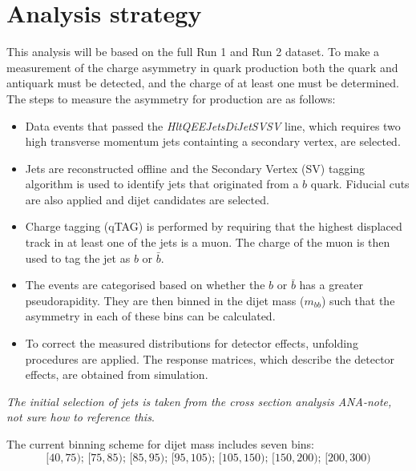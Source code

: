 \section{Analysis strategy} \label{sec:strategy}
This analysis will be based on the full Run 1 and Run 2 dataset. To make a measurement of the charge asymmetry in quark production both the quark and antiquark must be detected, and the charge of at least one must be determined. The steps to measure the asymmetry for \bbbar production are as follows:
\begin{itemize}
    \item Data events that passed the \textit{HltQEEJetsDiJetSVSV} \hlttwo line, which requires two high transverse momentum jets containting a secondary vertex, are selected.
    \item Jets are reconstructed offline and the Secondary Vertex (SV) tagging algorithm is used to identify jets that originated from a $b$ quark. Fiducial cuts are also applied and dijet candidates are selected.
    \item Charge tagging (qTAG) is performed by requiring that the highest \pt displaced track in at least one of the jets is a muon. The charge of the muon is then used to tag the jet as $b$ or $\bar{b}$.
    \item The events are categorised based on whether the $b$ or $\bar{b}$ has a greater pseudorapidity. They are then binned in the dijet mass ($m_{bb}$) such that the asymmetry in each of these bins can be calculated.
    \item To correct the measured distributions for detector effects, unfolding procedures are applied. The response matrices, which describe the detector effects, are obtained from simulation.
\end{itemize}
\textit{The initial selection of jets is taken from the cross section analysis ANA-note, not sure how to reference this}.

The current binning scheme for dijet mass includes seven bins:
\begin{equation*}
    [40,75);\, [75, 85);\, [85, 95);\, [95, 105);\, [105, 150);\, [150, 200);\, [200, 300)
\end{equation*}